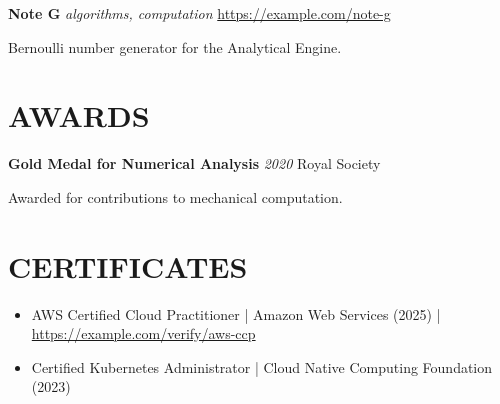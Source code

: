 \documentclass[fontsize=11pt]{article}
\newcommand{\NewPart}[1]{\vspace{3pt}\section*{\uppercase{#1}}}
\newcommand{\EducationEntry}[4]{
    \noindent \textbf{#1} \hfill      %
    \colorbox{Black}{
      \parbox{8.5em}{
      \hfill\color{White}#2}} \par  %
    \noindent \textit{#3} \par        %
    \noindent\hangindent=2em\hangafter=0 \small #4 %
    \normalsize \par}
\newcommand{\ProjectEntry}[4]{         %
    \noindent \textbf{#1} \noindent \textit{#3} \hfill {#2} \par
    \noindent \small #4 %
    \normalsize \par}
\newcommand{\AwardEntry}[4]{         %
    \noindent \textbf{#1} \noindent \textit{#3} \hfill {#2} \par
    \noindent \small #4 %
    \normalsize \par}
\begin{document}
      \ProjectEntry{Note G}{\href{https://example.com/note-g}{https://example.com/note-g}}
{algorithms, computation}
{Bernoulli number generator for the Analytical Engine.}
      \NewPart{Awards}{}

      \AwardEntry{Gold Medal for Numerical Analysis}{Royal Society}
{2020}
{Awarded for contributions to mechanical computation.}
\NewPart{Certificates}{}
\begin{itemize} \itemsep 2pt
  \item AWS Certified Cloud Practitioner | Amazon Web Services (2025) | \href{https://example.com/verify/aws-ccp}{https://example.com/verify/aws-ccp}
  \item Certified Kubernetes Administrator | Cloud Native Computing Foundation (2023)
\end{itemize}
    \ 
    
\end{document}
